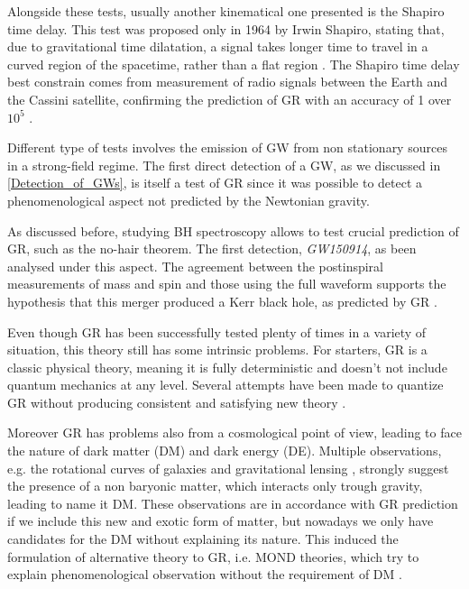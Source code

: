 Alongside these tests, usually another kinematical one presented is the Shapiro time delay. This test was proposed only in 1964 by Irwin Shapiro, stating that, due to gravitational time dilatation, a signal takes longer time to travel in a curved region of the spacetime, rather than a flat region \cite{pössel2019shapirotimedelayequivalence}. The Shapiro time delay best constrain comes from measurement of radio signals between the Earth and the Cassini satellite, confirming the prediction of GR with an accuracy of 1 over $10^5$ \cite{Bertotti:2003rm}.


Different type of tests involves the emission of GW from non stationary sources in a strong-field regime. The first direct detection of a GW, as we discussed in \ref{Detection_of_GWs}, is itself a test of GR since it was possible to detect a phenomenological aspect not predicted by the Newtonian gravity. 

As discussed before, studying BH spectroscopy allows to test crucial prediction of GR, such as the no-hair theorem. The first detection, \textit{GW150914}, as been analysed under this aspect. The agreement between the postinspiral measurements of mass and spin and those using the full waveform supports the hypothesis that this merger produced a Kerr black hole, as predicted by GR \cite{Isi_2019}.

Even though GR has been successfully tested plenty of times in a variety of situation, this theory still has some intrinsic problems. For starters, GR is a classic physical theory, meaning it is fully deterministic and doesn't not include quantum mechanics at any level. Several attempts have been made to quantize GR without producing consistent and satisfying new theory \cite{wallace2000quantizationgravityintroduction}. 

Moreover GR has problems also from a cosmological point of view, leading to face the nature of dark matter (DM) and dark energy (DE). Multiple observations, e.g. the rotational curves of galaxies and gravitational lensing \cite{sofue2020rotationcurvemilkyway, article_Lensing}, strongly suggest the presence of a non baryonic matter, which interacts only trough gravity, leading to name it DM. These observations are in accordance with GR prediction if we include this new and exotic form of matter, but nowadays we only have candidates for the DM without explaining its nature. This induced the formulation of alternative theory to GR, i.e. MOND theories, which try to explain phenomenological observation without the requirement of DM \cite{klačka2020alternativeapproachgravitymond}.

